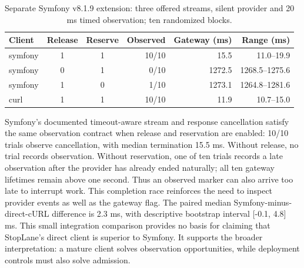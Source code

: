 \begin{table}[ht]\centering\small\begin{tabular}{@{}lccrrr@{}}\toprule Client & Release & Reserve & Observed & Gateway (ms) & Range (ms)\\\midrule
symfony & 1 & 1 & 10/10 & 15.5 & 11.0--19.9 \\
symfony & 0 & 1 & 0/10 & 1272.5 & 1268.5--1275.6 \\
symfony & 1 & 0 & 1/10 & 1273.1 & 1264.8--1281.6 \\
curl & 1 & 1 & 10/10 & 11.9 & 10.7--15.0 \\
\bottomrule\end{tabular}\caption{Separate Symfony v8.1.9 extension: three offered streams, silent provider and 20 ms timed observation; ten randomized blocks.}\label{tab:library}\end{table}
Symfony's documented timeout-aware stream and response cancellation satisfy the same observation contract when release and reservation are enabled: 10/10 trials observe cancellation, with median termination 15.5 ms. Without release, no trial records observation. Without reservation, one of ten trials records a late observation after the provider has already ended naturally; all ten gateway lifetimes remain above one second. Thus an observed marker can also arrive too late to interrupt work. This completion race reinforces the need to inspect provider events as well as the gateway flag. The paired median Symfony-minus-direct-cURL difference is 2.3 ms, with descriptive bootstrap interval [-0.1, 4.8] ms. This small integration comparison provides no basis for claiming that StopLane's direct client is superior to Symfony. It supports the broader interpretation: a mature client solves observation opportunities, while deployment controls must also solve admission.
